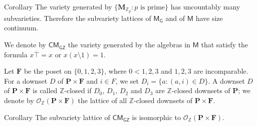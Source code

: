 \documentclass[professionalfont, 12pt]{beamer} %
\theoremstyle{plain}
\theoremstyle{definition}
\newcommand{\m}[1]{{\mathbf {#1} }}
\newcommand{\ld}{{\setminus}}
\newcommand{\bb}[1]{\mathbb {#1}}
\begin{document}
\begin{comment}
\begin{frame}{Sketch of the proof}
    \begin{block}{}
        $\m G \times \mathbb{Z}^r \in \mathcal{K}$ iff $\m G \times \mathbb{Z}^s \in \mathcal{K}$ for $r, s \in \bb{Z}^+$, $\m G \in \mathcal{FA}_{\text{fin}}$ and $\mathcal{K}$ an $\mathsf{ISP_U}$-class of abelian groups.
    \end{block}
    \pause
    \begin{block}{}
        The lattice of $\mathcal{K}_{\mathcal{FA}}$ is isomorphic to the lattice of $\mathcal{K}_{\mathcal{FA}'}$, where $\mathcal{FA}' = \{\m G, \bb{Z} \times \m G: \m G \in \mathcal{FA}_{\text{fin}}\}$.
    \end{block}
    \pause
    \begin{block}{}
    $\mathcal{FA}'$ is isomorphic to $\m P = \m 2 \times \m I^{\oplus \omega}$.
    \end{block}
    \begin{block}{Theorem}
    The subvariety lattice of $\mathsf{CM}_{\mathbf{G}}$ is isomorphic to $\mathcal{O}_{\mathbb{Z}}(\m P)$.
\end{block}
\end{frame}
\end{comment}

\begin{frame}
\begin{block}{Corollary}
    The variety generated by $\{\m M_{\mathbb{Z}_p}: p \text{ is prime}\}$ has uncountably many subvarieties. 
    Therefore the subvariety lattices of $\mathsf{M_G}$ and of $\mathsf{M}$ have size continuum.
\end{block}
\pause

We denote by $\mathsf{CM_{GZ}}$ the variety generated by the algebras in $\mathsf{M}$ that satisfy the formula $x \overline{\top} = x \text{ or } x(x \ld 1) = 1$.

Let $\m F$ be the poset on $\{0,1,2,3\}$, where $0 < 1, 2, 3$ and $1, 2, 3$ are incomparable.
For a downset $D$ of $\m P \times \m F$ and $i \in F$, we set $D_i = \{a: (a, i) \in D\}$. 
A downset $D$ of $\m P \times \m F$ is called $\mathbb{Z}$-closed if $D_0$, $D_1$, $D_2$ and $D_3$ are $\mathbb{Z}$-closed downsets of $\m P$; we denote by $\mathcal{O}_{\mathbb{Z}}(\m P \times \m F)$ the lattice of all $\mathbb{Z}$-closed downsets of $\m P \times \m F$.

\begin{block}{Corollary}
The subvariety lattice of $\mathsf{CM_{GZ}}$ is isomorphic to $\mathcal{O}_{\mathbb{Z}}(\m P \times \m F)$.
\end{block}
    
\end{frame}
\end{document}
